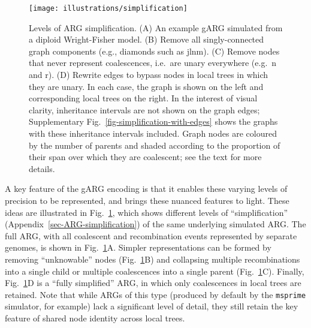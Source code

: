 \documentclass{article}
\newcommand{\noderef}[1]{\textsf{#1}}
\begin{document}
\begin{figure}
\centering
\texttt{[image: illustrations/simplification]}
\caption{\label{fig-simplification}
Levels of ARG simplification.
(A) An example gARG simulated from a diploid Wright-Fisher model.
(B) Remove all
singly-connected graph components (e.g., diamonds such as \noderef{jlnm}).
(C) Remove nodes that never represent coalescences,
i.e.\ are unary everywhere (e.g.\ \noderef{n} and \noderef{r}).
(D) Rewrite edges to bypass nodes in local trees in which they are unary.
In each case, the graph is shown on the left
and corresponding local trees on the right.
In the interest of visual clarity, inheritance intervals are not shown
on the graph edges; Supplementary Fig.~\ref{fig-simplification-with-edges}
shows the graphs with these inheritance intervals included.
Graph nodes are coloured by the number of parents and shaded
according to the proportion of their span over which they are coalescent;
see the text for more details.
}
\end{figure}

A key feature of the gARG encoding is that it enables these varying levels 
of precision to be represented, and brings these nuanced features to light.
These ideas are illustrated in Fig.~\ref{fig-simplification}, which shows
different levels of ``simplification'' (Appendix~\ref{sec-ARG-simplification})
of the same underlying simulated ARG. The full ARG, with all coalescent and
recombination events represented by separate genomes, is shown in
Fig.~\ref{fig-simplification}A. Simpler representations can be formed by
removing ``unknowable'' nodes (Fig.~\ref{fig-simplification}B) and collapsing
multiple recombinations into a single child or multiple coalescences into a
single parent (Fig.~\ref{fig-simplification}C). 
Finally, Fig.~\ref{fig-simplification}D is a ``fully simplified''
ARG, in which only coalescences in local trees are retained.
Note that while ARGs of this type (produced by default by the \texttt{msprime}
simulator, for example) lack a significant level of detail, they still
retain the key feature of shared node identity across local trees.
\end{document}
